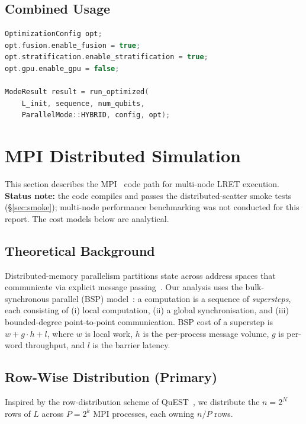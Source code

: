 \documentclass[11pt,a4paper]{article}
\begin{document}
\subsection{Combined Usage}

\begin{lstlisting}[language=C++, caption={Combined optimisation pipeline}]
OptimizationConfig opt;
opt.fusion.enable_fusion = true;
opt.stratification.enable_stratification = true;
opt.gpu.enable_gpu = false;

ModeResult result = run_optimized(
    L_init, sequence, num_qubits,
    ParallelMode::HYBRID, config, opt);
\end{lstlisting}

\section{MPI Distributed Simulation}
\label{sec:mpi}

This section describes the MPI~\cite{gropp1999mpi} code path for multi-node LRET
execution. \textbf{Status note:} the code compiles and passes the distributed-scatter
smoke tests (\S\ref{sec:smoke}); multi-node performance benchmarking was not conducted
for this report. The cost models below are analytical.

\subsection{Theoretical Background}

Distributed-memory parallelism partitions state across address spaces that communicate
via explicit message passing~\cite{gropp1999mpi,pacheco1996pp}. Our analysis uses the
bulk-synchronous parallel (BSP) model~\cite{valiant1990bsp}: a computation is a
sequence of \emph{supersteps}, each consisting of (i) local computation, (ii) a global
synchronisation, and (iii) bounded-degree point-to-point communication. BSP cost of a
superstep is $w + g\cdot h + l$, where $w$ is local work, $h$ is the per-process
message volume, $g$ is per-word throughput, and $l$ is the barrier latency.

\subsection{Row-Wise Distribution (Primary)}

Inspired by the row-distribution scheme of QuEST~\cite{jones2019quest}, we distribute
the $n = 2^N$ rows of $L$ across $P = 2^k$ MPI processes, each owning $n/P$ rows.
\end{document}
